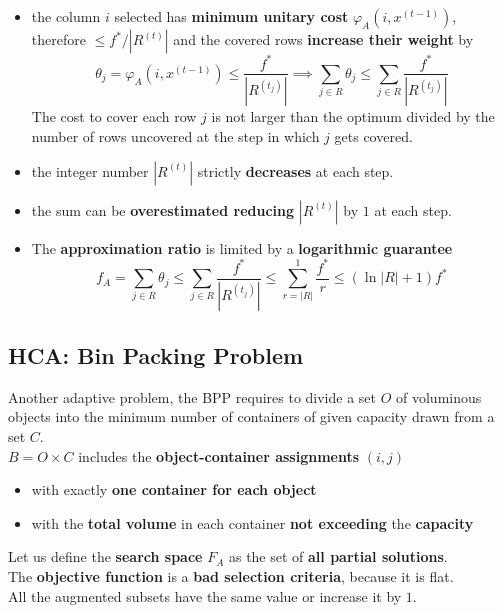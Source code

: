 \begin{itemize}
	\item the column $i$ selected has \textbf{minimum unitary cost} $\varphi_A (i, x^{(t−1)})$, therefore $\leq f^\ast /|R^{(t)}|$ and the covered rows \textbf{increase their weight} by
	$$ \theta_j = \varphi_A (i, x^{(t-1)}) \leq \frac{f^\ast}{|R^{(t_j)}|} \implies \sum_{j \in R} \theta_j \leq \sum_{j \in R} \frac{f^\ast}{|R^{(t_j)}|} $$
	The cost to cover each row $j$ is not larger than the optimum divided by the number of rows uncovered at the step in which $j$ gets covered.\\
	
	\item the integer number $|R^{(t)}|$ strictly \textbf{decreases} at each step.\\
	
	\item the sum can be \textbf{overestimated reducing} $|R^{(t)}|$ by $1$ at each step.\\
	
	\item The \textbf{approximation ratio} is limited by a \textbf{logarithmic guarantee}
	$$ f_A = \sum_{j \in R} \theta_j \leq \sum_{j \in R} \frac{f^\ast}{|R^{(t_j)}|} \leq \sum_{r=|R|}^1 \frac{f^\ast}{r} \leq \left(\ln |R| + 1\right) f^\ast $$
\end{itemize}

\newpage

\subsection{HCA: Bin Packing Problem}
Another adaptive problem, the BPP requires to divide a set $O$ of voluminous objects into the minimum number of containers of given capacity drawn from a set $C$.\\

$B = O \times C$ includes the \textbf{object-container assignments} $(i, j)$
\begin{itemize}
	\item with exactly \textbf{one container for each object}
	\item with the \textbf{total volume} in each container \textbf{not exceeding} the \textbf{capacity}
\end{itemize}

Let us define the \textbf{search space} $F_A$ as the set of \textbf{all partial solutions}.\\

The \textbf{objective function} is a \textbf{bad selection criteria}, because it is flat.\\
All the augmented subsets have the same value or increase it by $1$.\\

